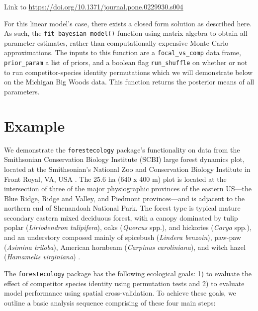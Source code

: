 \documentclass[12pt]{article}
\begin{document}
Link to \url{https://doi.org/10.1371/journal.pone.0229930.s004}

For this linear model's case, there exists a closed form solution as
described here. As such, the \texttt{fit\_bayesian\_model()} function
using matrix algebra to obtain all parameter estimates, rather than
computationally expensive Monte Carlo approximations. The inputs to this
function are a \texttt{focal\_vs\_comp} data frame,
\texttt{prior\_param} a list of priors, and a boolean flag
\texttt{run\_shuffle} on whether or not to run competitor-species
identity permutations which we will demonstrate below on the Michigan
Big Woods data. This function returns the posterior means of all
parameters.

\hypertarget{example}{%
\section{Example}\label{example}}

We demonstrate the \texttt{forestecology} package's functionality on
data from the Smithsonian Conservation Biology Institute (SCBI) large
forest dynamics plot, located at the Smithsonian's National Zoo and
Conservation Biology Institute in Front Royal, VA, USA
\citet{bourg_initial_2013}. The 25.6 ha (640 x 400 m) plot is located at
the intersection of three of the major physiographic provinces of the
eastern US---the Blue Ridge, Ridge and Valley, and Piedmont
provinces---and is adjacent to the northern end of Shenandoah National
Park. The forest type is typical mature secondary eastern mixed
deciduous forest, with a canopy dominated by tulip poplar
(\emph{Liriodendron tulipifera}), oaks (\emph{Quercus} spp.), and
hickories (\emph{Carya} spp.), and an understory composed mainly of
spicebush (\emph{Lindera benzoin}), paw-paw (\emph{Asimina triloba}),
American hornbeam (\emph{Carpinus caroliniana}), and witch hazel
(\emph{Hamamelis virginiana}) \citet{bourg_initial_2013}.

The \texttt{forestecology} package has the following ecological goals:
1) to evaluate the effect of competitor species identity using
permutation tests and 2) to evaluate model performance using spatial
cross-validation. To achieve these goals, we outline a basic analysis
sequence comprising of these four main steps:
\end{document}
